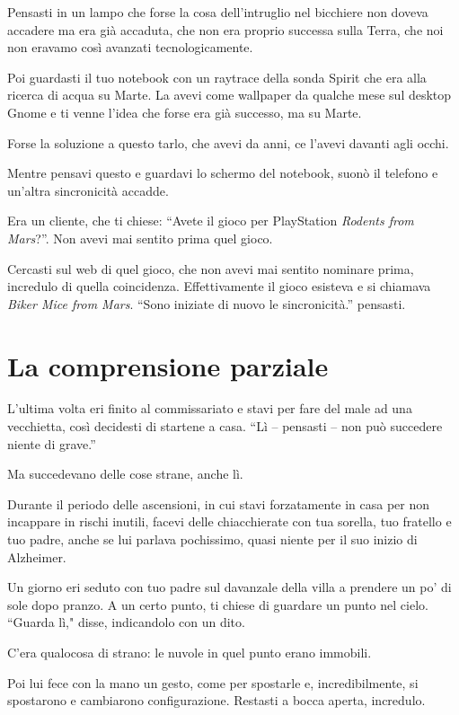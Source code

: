 Pensasti in un lampo che forse la cosa dell'intruglio nel bicchiere non doveva accadere ma era già accaduta, che non era proprio successa sulla Terra, che noi non eravamo così avanzati tecnologicamente.

Poi guardasti il tuo notebook con un raytrace della sonda Spirit che era alla ricerca di acqua su Marte. La avevi come wallpaper da qualche mese sul desktop Gnome e ti venne l'idea che forse era già successo, ma su Marte.

Forse la soluzione a questo tarlo, che avevi da anni, ce l'avevi davanti agli occhi.

Mentre pensavi questo e guardavi lo schermo del notebook, suonò il telefono e un'altra sincronicità accadde.

Era un cliente, che ti chiese: “Avete il gioco per PlayStation \textit{Rodents from Mars}?”. Non avevi mai sentito prima quel gioco.

Cercasti sul web di quel gioco, che non avevi mai sentito nominare prima, incredulo di quella coincidenza. Effettivamente il gioco esisteva e si chiamava \textit{Biker Mice from Mars}. “Sono iniziate di nuovo le sincronicità.” pensasti.

\section{La comprensione parziale}
\label{comprensione_parziale}

L'ultima volta eri finito al commissariato e stavi per fare del male ad una vecchietta, così decidesti di startene a casa. “Lì -- pensasti -- non può succedere niente di grave.”

Ma succedevano delle cose strane, anche lì.

Durante il periodo delle ascensioni, in cui stavi forzatamente in casa per non incappare in rischi inutili, facevi delle chiacchierate con tua sorella, tuo fratello e tuo padre, anche se lui parlava pochissimo, quasi niente per il suo inizio di Alzheimer.

Un giorno eri seduto con tuo padre sul davanzale della villa a prendere un po' di sole dopo pranzo. A un certo punto, ti chiese di guardare un punto nel cielo. “Guarda lì," disse, indicandolo con un dito.

C'era qualocosa di strano: le nuvole in quel punto erano immobili.

Poi lui fece con la mano un gesto, come per spostarle e, incredibilmente, si spostarono e cambiarono configurazione.  Restasti a bocca aperta, incredulo.


